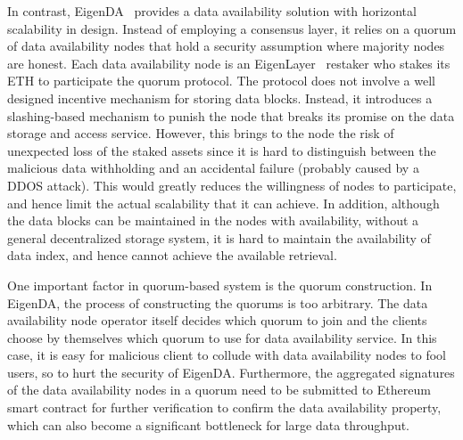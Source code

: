 In contrast, EigenDA~\cite{eigenda} provides a data availability solution with horizontal scalability in design. Instead of employing a consensus layer, it relies on a quorum of data availability nodes that hold a security assumption where majority nodes are honest. Each data availability node is an EigenLayer~\cite{eigenlayer} restaker who stakes its ETH to participate the quorum protocol. The protocol does not involve a well designed incentive mechanism for storing data blocks. Instead, it introduces a slashing-based mechanism to punish the node that breaks its promise on the data storage and access service. However, this brings to the node the risk of unexpected loss of the staked assets since it is hard to distinguish between the malicious data withholding and an accidental failure (probably caused by a DDOS attack). This would greatly reduces the willingness of nodes to participate, and hence limit the actual scalability that it can achieve. 
In addition, although the data blocks can be maintained in the nodes with availability, without a general decentralized storage system, it is hard to maintain the availability of data index, and hence cannot achieve the available retrieval.

One important factor in quorum-based system is the quorum construction. In EigenDA, the process of constructing the quorums is too arbitrary. The data availability node operator itself decides which quorum to join and the clients choose by themselves which quorum to use for data availability service. In this case, it is easy for malicious client to collude with data availability nodes to fool users, so to hurt the security of EigenDA. 
Furthermore, the aggregated signatures of the data availability nodes in a quorum need to be submitted to Ethereum smart contract for further verification to confirm the data availability property, which can also become a significant bottleneck for large data throughput.  

